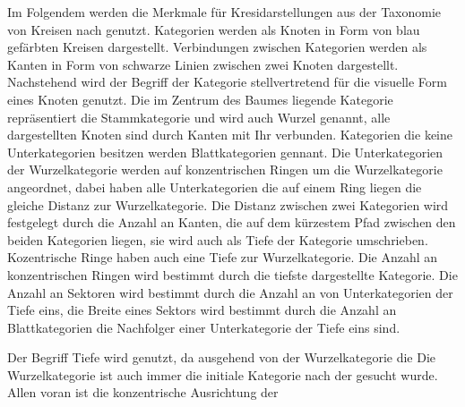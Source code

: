 
Im Folgendem werden die Merkmale für Kresidarstellungen aus der Taxonomie von Kreisen nach \cite[p.~57]{lima2017circle} genutzt.
Kategorien werden als Knoten in Form von blau gefärbten Kreisen dargestellt.
Verbindungen zwischen Kategorien werden als Kanten in Form von schwarze Linien zwischen zwei Knoten dargestellt.
Nachstehend wird der Begriff der Kategorie stellvertretend für die visuelle Form eines Knoten genutzt.
Die im Zentrum des Baumes liegende Kategorie repräsentiert die Stammkategorie und wird auch Wurzel genannt, alle dargestellten Knoten sind durch Kanten mit Ihr verbunden.
Kategorien die keine Unterkategorien besitzen werden Blattkategorien gennant.
Die Unterkategorien der Wurzelkategorie werden auf konzentrischen Ringen um die Wurzelkategorie angeordnet, dabei haben alle Unterkategorien die auf einem Ring liegen die gleiche Distanz zur Wurzelkategorie.
Die Distanz zwischen zwei Kategorien wird festgelegt durch die Anzahl an Kanten, die auf dem kürzestem Pfad zwischen den beiden Kategorien liegen, sie wird auch als Tiefe der Kategorie umschrieben.
Kozentrische Ringe haben auch eine Tiefe zur Wurzelkategorie.
Die Anzahl an konzentrischen Ringen wird bestimmt durch die tiefste dargestellte Kategorie.
Die Anzahl an Sektoren wird bestimmt durch die Anzahl an von Unterkategorien der Tiefe eins, die Breite eines Sektors wird bestimmt durch die Anzahl an Blattkategorien die Nachfolger einer Unterkategorie der Tiefe eins sind.



Der Begriff Tiefe wird genutzt, da ausgehend von der Wurzelkategorie die 
Die Wurzelkategorie ist auch immer die initiale Kategorie nach der gesucht wurde.
Allen voran ist die konzentrische Ausrichtung der 












